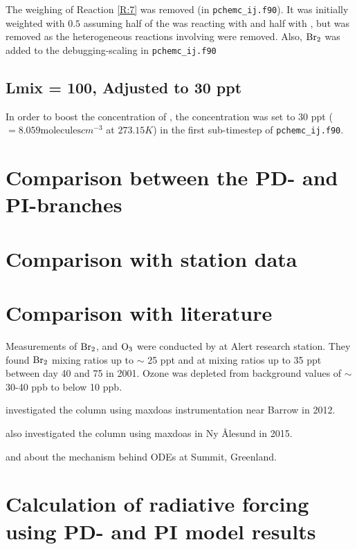 The weighing of Reaction \ref{R:7} was removed (in \texttt{pchemc\_ij.f90}). It was initially weighted with $0.5$ assuming half of the  was reacting with  and half with , but was removed as the heterogeneous reactions involving  were removed. Also, $\mathrm{Br_2}$ was added to the debugging-scaling in \texttt{pchemc\_ij.f90}

\subsection{Lmix = 100,  Adjusted to 30 ppt}

In order to boost the concentration of , the concentration was set to 30 ppt ($= 8.059 \text{molecules}cm^{-3}$ at $273.15 K$) in the first sub-timestep of \texttt{pchemc\_ij.f90}.  


\section{Comparison between the PD- and PI-branches}

\section{Comparison with station data}

\section{Comparison with literature}

Measurements of $\mathrm{Br_2}$,  and $\mathrm{O_3}$ were conducted by \cite{Foster2001} at Alert research station. They found $\mathrm{Br_2}$ mixing ratios up to $\sim$ 25 \acrshort{ppt} and  at mixing ratios up to 35 \acrshort{ppt} between day 40 and 75 in 2001. Ozone was depleted from background values of $\sim$ 30-40 \acrshort{ppb} to below 10 ppb. 

\medskip

\cite{Simpson2017} investigated the  column using \acrlong{maxdoas} instrumentation near Barrow in 2012.

\medskip

\cite{Luo2018} also investigated the  column using \acrshort{maxdoas} in Ny Ålesund in 2015. 

\medskip

\cite{Thomas2012} and \cite{Thomas2011} about the mechanism behind ODEs at Summit, Greenland. 

\section{Calculation of radiative forcing using PD- and PI model results}